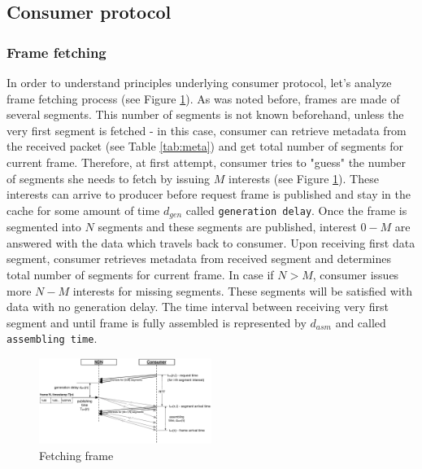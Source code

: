 \documentclass[10pt]{proc}
\begin{document}
\subsection{Consumer protocol}

\subsubsection{Frame fetching}

In order to understand principles underlying consumer protocol, let's analyze frame fetching process (see Figure \ref{fig:pull}). As was noted before, frames are made of several segments. This number of segments is not known beforehand, unless the very first segment is fetched - in this case, consumer can retrieve metadata from the received packet (see Table \ref{tab:meta}) and get total number of segments for current frame. Therefore, at first attempt, consumer tries to "guess" the number of segments she needs to fetch by issuing $M$ interests (see Figure \ref{fig:pull}). These interests can arrive to producer before request frame is published and stay in the cache for some amount of time $d_{gen}$ called \texttt{generation delay}. Once the frame is segmented into $N$ segments and these segments are published, interest $0 - M$ are answered with the data which travels back to consumer. Upon receiving first data segment, consumer retrieves metadata from received segment and determines total number of segments for current frame. In case if $N > M$, consumer issues more $N - M$ interests for missing segments. These segments will be satisfied with data with no generation delay. The time interval between receiving very first segment and until frame is fully assembled is represented by $d_{asm}$ and called \texttt{assembling time}.

\begin{figure}[Ht!]
\centering
\includegraphics[width=0.5\textwidth]{frame-fetch}
\caption{Fetching frame}
\label{fig:pull}
\end{figure}
\end{document}
